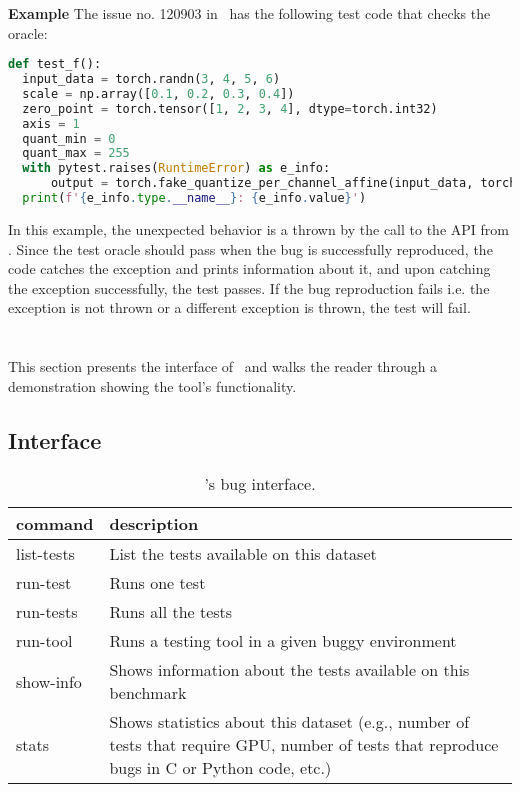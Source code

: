 \documentclass[sigconf,screen]{acmart}
\begin{document}
\textbf{Example}
  The issue no. 120903 in \torch\ has the following test code that checks the oracle:

\begin{lstlisting}[language=python,basicstyle=\small,]
def test_f():
  input_data = torch.randn(3, 4, 5, 6)
  scale = np.array([0.1, 0.2, 0.3, 0.4])
  zero_point = torch.tensor([1, 2, 3, 4], dtype=torch.int32)
  axis = 1
  quant_min = 0
  quant_max = 255
  with pytest.raises(RuntimeError) as e_info:
      output = torch.fake_quantize_per_channel_affine(input_data, torch.from_numpy(scale), zero_point, axis, quant_min, quant_max)
  print(f'{e_info.type.__name__}: {e_info.value}')
\end{lstlisting}

In this example, the unexpected behavior is a  thrown by the call to the  API from \torch. Since the test oracle should pass when the bug is successfully reproduced, the code catches the exception and prints information about it, and upon catching the exception successfully, the test passes. If the bug reproduction fails i.e. the exception is not thrown or a different exception is thrown, the test will fail.

\section{\tname} %

This section presents the interface of \tname\ and walks the reader
through a demonstration showing the tool's functionality.


\subsection{Interface}

\begin{table}
  \centering
  \caption{\label{table:bug-interface}\tname's bug interface.}
\begin{tabular}{lp{6.5cm}}
  \toprule
  \textbf{command} & \textbf{description} \\
  \midrule
list-tests & List the tests available on this dataset\\
run-test & Runs one test\\
run-tests & Runs all the tests\\
run-tool & Runs a testing tool in a given buggy environment \\
show-info & Shows information about the tests available on this benchmark\\
stats & Shows statistics about this dataset (e.g., number of tests
that require GPU, number of tests that reproduce bugs in C or Python
code, etc.)\\
\bottomrule
\end{tabular}
\end{table}
\end{document}
